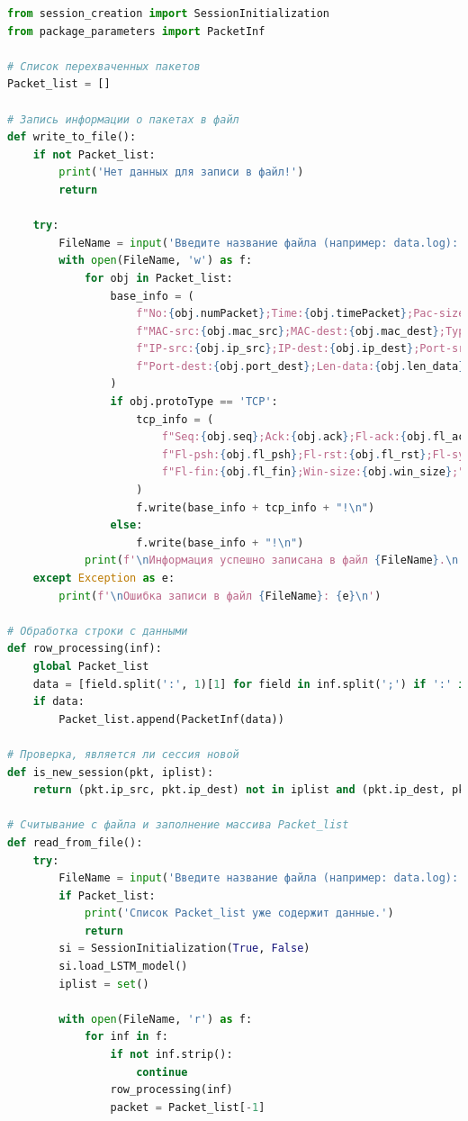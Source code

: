 \documentclass[spec, och, diploma]{SCWorks}
\begin{document}
    \begin{lstlisting}[language=Python]
from session_creation import SessionInitialization
from package_parameters import PacketInf

# Список перехваченных пакетов
Packet_list = []

# Запись информации о пакетах в файл
def write_to_file():
    if not Packet_list:
        print('Нет данных для записи в файл!')
        return
    
    try:
        FileName = input('Введите название файла (например: data.log): ')
        with open(FileName, 'w') as f:
            for obj in Packet_list:
                base_info = (
                    f"No:{obj.numPacket};Time:{obj.timePacket};Pac-size:{obj.packetSize};"
                    f"MAC-src:{obj.mac_src};MAC-dest:{obj.mac_dest};Type:{obj.protoType};"
                    f"IP-src:{obj.ip_src};IP-dest:{obj.ip_dest};Port-src:{obj.port_src};"
                    f"Port-dest:{obj.port_dest};Len-data:{obj.len_data};"
                )
                if obj.protoType == 'TCP':
                    tcp_info = (
                        f"Seq:{obj.seq};Ack:{obj.ack};Fl-ack:{obj.fl_ack};"
                        f"Fl-psh:{obj.fl_psh};Fl-rst:{obj.fl_rst};Fl-syn:{obj.fl_syn};"
                        f"Fl-fin:{obj.fl_fin};Win-size:{obj.win_size};"
                    )
                    f.write(base_info + tcp_info + "!\n")
                else:
                    f.write(base_info + "!\n")
            print(f'\nИнформация успешно записана в файл {FileName}.\n')
    except Exception as e:
        print(f'\nОшибка записи в файл {FileName}: {e}\n')

# Обработка строки с данными
def row_processing(inf):
    global Packet_list
    data = [field.split(':', 1)[1] for field in inf.split(';') if ':' in field]
    if data:
        Packet_list.append(PacketInf(data))

# Проверка, является ли сессия новой
def is_new_session(pkt, iplist):
    return (pkt.ip_src, pkt.ip_dest) not in iplist and (pkt.ip_dest, pkt.ip_src) not in iplist

# Считывание с файла и заполнение массива Packet_list
def read_from_file():
    try:
        FileName = input('Введите название файла (например: data.log): ')
        if Packet_list:
            print('Список Packet_list уже содержит данные.')
            return
        si = SessionInitialization(True, False)
        si.load_LSTM_model()
        iplist = set()
        
        with open(FileName, 'r') as f:
            for inf in f:
                if not inf.strip():
                    continue
                row_processing(inf)
                packet = Packet_list[-1]
                

\end{lstlisting}
\end{document}

